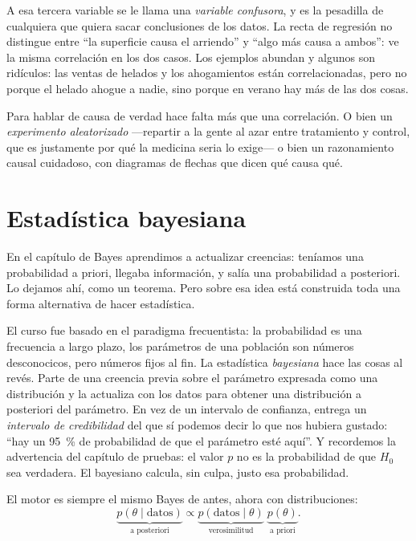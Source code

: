 A esa tercera variable se le llama una \emph{variable confusora}, y es la pesadilla de cualquiera que quiera sacar conclusiones de los datos. La recta de regresión no distingue entre \enquote{la superficie causa el arriendo} y \enquote{algo más causa a ambos}: ve la misma correlación en los dos casos. Los ejemplos abundan y algunos son ridículos: las ventas de helados y los ahogamientos están correlacionadas, pero no porque el helado ahogue a nadie, sino porque en verano hay más de las dos cosas.

Para hablar de causa de verdad hace falta más que una correlación. O bien un \emph{experimento aleatorizado} ---repartir a la gente al azar entre tratamiento y control, que es justamente por qué la medicina seria lo exige--- o bien un razonamiento causal cuidadoso, con diagramas de flechas que dicen qué causa qué. 

\section{Estadística bayesiana}

En el capítulo de Bayes aprendimos a actualizar creencias: teníamos una probabilidad a priori, llegaba información, y salía una probabilidad a posteriori. Lo dejamos ahí, como un teorema. Pero sobre esa idea está construida toda una forma alternativa de hacer estadística.

El curso fue basado en el paradigma frecuentista: la probabilidad es una frecuencia a largo plazo, los parámetros de una población son números desconocicos, pero números fijos al fin. La estadística \emph{bayesiana} hace las cosas al revés. Parte de una creencia previa sobre el parámetro expresada como una distribución y la actualiza con los datos para obtener una distribución a posteriori del parámetro. En vez de un intervalo de confianza, entrega un \emph{intervalo de credibilidad} del que sí podemos decir lo que nos hubiera gustado: \enquote{hay un \qty{95}{\percent} de probabilidad de que el parámetro esté aquí}. Y recordemos la advertencia del capítulo de pruebas: el valor \(p\) no es la probabilidad de que \(H_0\) sea verdadera. El bayesiano calcula, sin culpa, justo esa probabilidad.

\formal
El motor es siempre el mismo Bayes de antes, ahora con distribuciones: \[\underbrace{p(\theta \mid \text{datos})}_{\text{a posteriori}} \propto \underbrace{p(\text{datos}\mid\theta)}_{\text{verosimilitud}}\;\underbrace{p(\theta)}_{\text{a priori}}.\]
\informal

